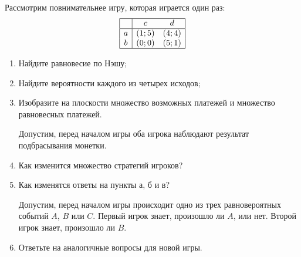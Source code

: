 \begin{problem}

Рассмотрим повнимательнее игру, которая играется один раз:
\[\begin{array}{|c|cc|}  \hline {} & {c} & {d} \\  \hline {a} & {\left(1;5\right)} & {\left(4;4\right)} \\ {b} & {\left(0;0\right)} & {\left(5;1\right)} \\  \hline  \end{array}\]
\begin{enumerate}
\item Найдите равновесие по Нэшу;\par
\item Найдите вероятности каждого из четырех исходов;\par
\item  Изобразите на плоскости множество возможных платежей и множество равновесных платежей.\par
Допустим, перед началом игры оба игрока наблюдают результат подбрасывания монетки.\par
\item Как изменится множество стратегий игроков?\par
\item Как изменятся ответы на пункты а, б и в?\par
Допустим, перед началом игры происходит одно из трех равновероятных событий  $A$,  $B$  или  $C$. Первый игрок знает, произошло ли  $A$, или нет. Второй игрок знает, произошло ли  $B$.\par
\item Ответьте на аналогичные вопросы для новой игры.\par
\end{enumerate}


\begin{sol}

\end{sol}
\end{problem}



